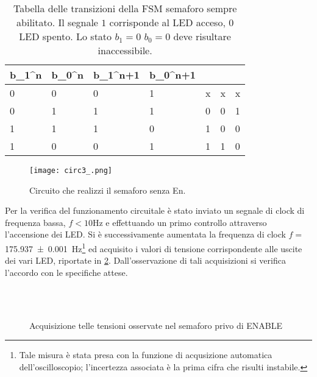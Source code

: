 \begin{table}[h]
\centering
\begin{tabular}{ss|ss|sss}
	\toprule
	b_{1}^{n} & b_{0}^{n}  & b_{1}^{n+1} & b_{0}^{n+1} &  &  &  \\
	 & 0 & 0 & 1  & x  & x & x \\
	 0 & 1 & 1 & 1  & 0 & 0 & 1  \\
	 1 & 1 & 1 & 0  & 1 & 0 & 0 \\
	 1 & 0 & 0 & 1  & 1 & 1 & 0 \\
	\bottomrule
\end{tabular}
\caption{Tabella delle transizioni della FSM semaforo sempre abilitato.
Il segnale $1$ corrisponde al LED acceso, $0$ LED spento.
Lo stato $b_{1}=0$ $b_{0}=0$ deve risultare inaccessibile. }
\label{tab:tran}
\end{table}

\begin{figure}[h!]
		\centering
		\texttt{[image: circ3\_.png]}
		\caption{Circuito che realizzi il semaforo senza En.}
		\label{fig:sem2}
	\end{figure}

Per la verifica del funzionamento circuitale è stato 
 inviato un segnale di clock di frequenza bassa, $f<10 $\si{\hertz} e effettuando un primo controllo attraverso l'accensione dei LED. Si è successivamente aumentata la frequenza di clock $f= $\SI{175.937\pm 0.001}{\hertz}\footnote{Tale misura è stata presa con la funzione di acqusizione automatica dell'oscilloscopio;  l'incertezza associata è la prima cifra che risulti instabile.}
 ed acquisito i valori di tensione corrispondente alle uscite dei vari LED, riportate in 
 \figurename{ \ref{fig:acq}}. Dall'osservazione di
  tali acquisizioni si verifica l'accordo con le specifiche attese. 
 
\begin{figure}[h]
	\centering
	\\
	\\

\caption{Acquisizione telle tensioni osservate nel semaforo privo di ENABLE}
\label{fig:acq}
\end{figure}
